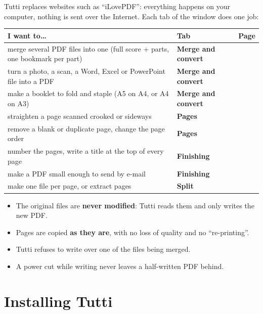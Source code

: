 Tutti replaces websites such as “iLovePDF”: everything happens on your computer, nothing is
sent over the Internet. Each tab of the window does one job:

\begin{center}
\renewcommand{\arraystretch}{1.4}
\begin{tabularx}{\linewidth}{>{\raggedright\arraybackslash}X >{\sffamily\bfseries\color{bordeaux}}l c}
\toprule
\textbf{I want to…} & \textbf{\color{ink}Tab} & \textbf{Page} \\
\midrule
merge several PDF files into one (full score + parts, one bookmark per part) & Merge and convert & \pageref{sec:assembler} \\
turn a photo, a scan, a Word, Excel or PowerPoint file into a PDF & Merge and convert & \pageref{sec:convertir} \\
make a booklet to fold and staple (A5 on A4, or A4 on A3) & Merge and convert & \pageref{sec:options} \\
straighten a page scanned crooked or sideways & Pages & \pageref{sec:pages} \\
remove a blank or duplicate page, change the page order & Pages & \pageref{sec:pages} \\
number the pages, write a title at the top of every page & Finishing & \pageref{sec:finitions} \\
make a PDF small enough to send by e-mail & Finishing & \pageref{sec:finitions} \\
make one file per page, or extract pages & Split & \pageref{sec:decouper} \\
\bottomrule
\end{tabularx}
\end{center}

\begin{securitebox}
\begin{itemize}
\item The original files are \textbf{never modified}: Tutti reads them and only writes the new PDF.
\item Pages are copied \textbf{as they are}, with no loss of quality and no “re-printing”.
\item Tutti refuses to write over one of the files being merged.
\item A power cut while writing never leaves a half-written PDF behind.
\end{itemize}
\end{securitebox}

\section{Installing Tutti}

